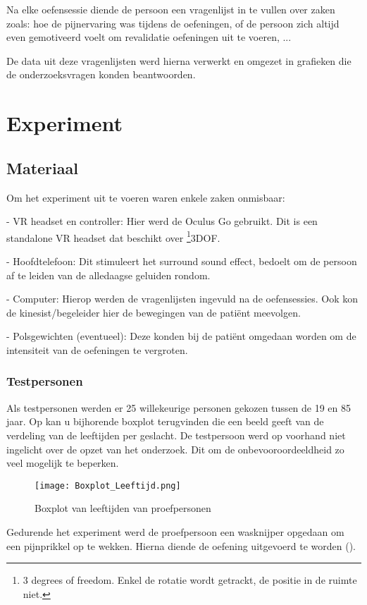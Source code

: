 Na elke oefensessie diende de persoon een vragenlijst in te vullen 
over zaken zoals: hoe de pijnervaring was tijdens de oefeningen, of de persoon zich altijd even gemotiveerd voelt om revalidatie oefeningen uit te voeren, ...

De data uit deze vragenlijsten werd hierna verwerkt en omgezet in grafieken die de onderzoeksvragen konden beantwoorden.

\chapter{Experiment}

\section{Materiaal}
Om het experiment uit te voeren waren enkele zaken onmisbaar:

- VR headset en controller: Hier werd de Oculus Go gebruikt. Dit is een standalone VR headset dat beschikt over \footnote{3 degrees of freedom. Enkel de rotatie wordt getrackt, de positie in de ruimte niet.}3DOF.

- Hoofdtelefoon: Dit stimuleert het surround sound effect, bedoelt om de persoon af te leiden van de alledaagse geluiden rondom.

- Computer: Hierop werden de vragenlijsten ingevuld na de oefensessies. Ook kon de kinesist/begeleider hier de bewegingen van de patiënt meevolgen.

- Polsgewichten (eventueel): Deze konden bij de patiënt omgedaan worden om de intensiteit van de oefeningen te vergroten.

\newpage
\subsection{Testpersonen}
Als testpersonen werden er 25 willekeurige personen gekozen tussen de 19 en 85 jaar. Op \cite{figuur 6.1} kan u bijhorende boxplot terugvinden die een beeld geeft van de verdeling van de leeftijden per geslacht. De testpersoon werd op voorhand niet ingelicht over de opzet van het onderzoek. Dit om de onbevooroordeeldheid zo veel mogelijk te beperken.

\begin{figure}[h]
    \centering
    \texttt{[image: Boxplot\_Leeftijd.png]}
    \caption{Boxplot van leeftijden van proefpersonen}
    \label{figuur 6.1}
\end{figure}

Gedurende het experiment werd de proefpersoon een wasknijper opgedaan om een pijnprikkel op te wekken. Hierna diende de oefening uitgevoerd te worden (\cite{figuur 6.2}). 

